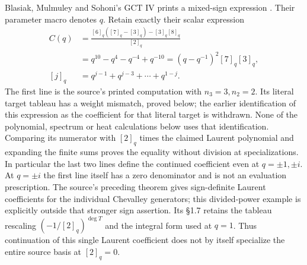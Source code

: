 Blasiak, Mulmuley and Sohoni's GCT IV prints a mixed-sign expression
\cite[\S17.2, example labelled ``ex not positive'']{blasiakMulmuleySohoni2013}.
Their parameter macro denotes $q$. Retain exactly their scalar expression
\begin{equation}\label{eq:gct-source-coefficient}
 \begin{split}
 C(q)&=\frac{[6]_q([7]_q-[3]_q)-[3]_q[8]_q}{[2]_q}\\
     &=q^{10}-q^4-q^{-4}+q^{-10}
       =(q-q^{-1})^2[7]_q[3]_q,\\
 [j]_q&=q^{j-1}+q^{j-3}+\cdots+q^{1-j}.
 \end{split}
\end{equation}
The first line is the source's printed computation with $n_3=3,n_2=2$.
Its literal target tableau has a weight mismatch, proved below; the
earlier identification of this expression as the coefficient for that
literal target is withdrawn. None of the polynomial, spectrum or
heat calculations below uses that identification.
Comparing its numerator with $[2]_q$ times the claimed Laurent polynomial
and expanding the finite sums proves the equality without division at
specializations. In particular the last two lines define the continued
coefficient even at $q=\pm1,\pm i$. At $q=\pm i$ the first line itself
has a zero denominator and is not an evaluation prescription.
The source's preceding theorem gives sign-definite Laurent coefficients
for the individual Chevalley generators; this divided-power example is
explicitly outside that stronger sign assertion. Its \S1.7 retains the
tableau rescaling $(-1/[2]_q)^{\deg T}$ and the integral form used at $q=1$.
Thus continuation of this single Laurent coefficient does not by itself
specialize the entire source basis at $[2]_q=0$.

